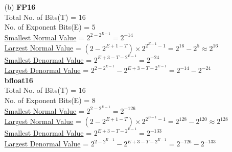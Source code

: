 \documentclass[letterpaper]{article}
\begin{document}
\begin{large}
\begin{flushleft}
\begin{enumerate}
\begin{enumerate}
\item[(b) ]\textbf{FP16}\\[0.1in]
Total No. of Bits(T) = $16$\\[0.1in]
No. of Exponent Bits(E) = $5$\\[0.1in]
\underline{Smallest Normal Value} = $2^{2 - 2^{E-1}}=2^{-14}$\\[0.1in]
\underline{Largest Normal Value} = $(2-2^{E+1-T})\times 2^{2^{E-1}-1}=2^{16}-2^5\approx2^{16}$\\[0.1in]
\underline{Smallest Denormal Value} = $2^{E+3-T-2^{E-1}}=2^{-24}$\\[0.1in]
\underline{Largest Denormal Value} = $2^{2-2^{E-1}}-2^{E+3-T-2^{E-1}}=2^{-14}-2^{-24}$\\[0.2in]
\textbf{bfloat16}\\[0.1in]
Total No. of Bits(T) = $16$\\[0.1in]
No. of Exponent Bits(E) = $8$\\[0.1in]
\underline{Smallest Normal Value} = $2^{2 - 2^{E-1}}=2^{-126}$\\[0.1in]
\underline{Largest Normal Value} = $(2-2^{E+1-T})\times 2^{2^{E-1}-1}=2^{128}-2^{120}\approx2^{128}$\\[0.1in]
\underline{Smallest Denormal Value} = $2^{E+3-T-2^{E-1}}=2^{-133}$\\[0.1in]
\underline{Largest Denormal Value} = $2^{2-2^{E-1}}-2^{E+3-T-2^{E-1}}=2^{-126}-2^{-133}$\\[0.2in]


\end{enumerate}
\end{enumerate}
\end{flushleft}
\end{large}
\end{document}
